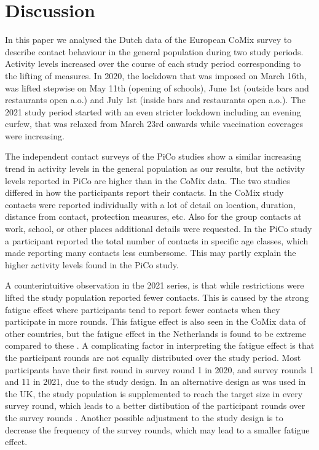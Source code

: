 \documentclass[fleqn,10pt]{wlscirep}
\begin{document}
\section*{Discussion}

In this paper we analysed the Dutch data of the European CoMix survey to describe contact behaviour in the general population during two study periods. Activity levels increased over the course of each study period corresponding to the lifting of measures. In 2020, the lockdown that was imposed on March 16th, was lifted stepwise on May 11th (opening of schools), June 1st (outside bars and restaurants open a.o.) and July 1st (inside bars and restaurants open a.o.). The 2021 study period started with an even stricter lockdown including an evening curfew, that was relaxed from March 23rd onwards while vaccination coverages were increasing.

The independent contact surveys of the PiCo studies show a similar increasing trend in activity levels in the general population as our results, but the activity levels reported in PiCo are higher than in the CoMix data. The two studies differed in how the participants report their contacts. In the CoMix study contacts were reported individually with a lot of detail on location, duration, distance from contact, protection measures, etc. Also for the group contacts at work, school, or other places additional details were requested. In the PiCo study a participant reported the total number of contacts in specific age classes, which made reporting many contacts less cumbersome. This may partly explain the higher activity levels found in the PiCo study.

A counterintuitive observation in the 2021 series, is that while restrictions were lifted the study population reported fewer contacts. This is caused by the strong fatigue effect where participants tend to report fewer contacts when they participate in more rounds. This fatigue effect is also seen in the CoMix data of other countries, but the fatigue effect in the Netherlands is found to be extreme compared to these \cite{Wong_2022b}. A complicating factor in interpreting the fatigue effect is that the participant rounds are not equally distributed over the study period. Most participants have their first round in survey round 1 in 2020, and survey rounds 1 and 11 in 2021, due to the study design. In an alternative design as was used in the UK, the study population is supplemented to reach the target size in every survey round, which leads to a better distibution of the participant rounds over the survey rounds \cite{Gimma_2022}. Another possible adjustment to the study design is to decrease the frequency of the survey rounds, which may lead to a smaller fatigue effect.
\end{document}
